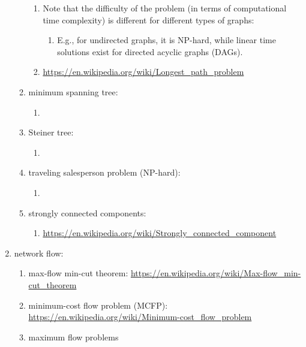 \begin{enumerate}
\begin{enumerate}
		\begin{enumerate} \itemsep -2pt
		\item Note that the difficulty of the problem (in terms of computational time complexity) is different for different types of graphs: \vspace{-0.1cm}
			\begin{enumerate} \itemsep -1pt
			\item E.g., for undirected graphs, it is NP-hard, while linear time solutions exist for directed acyclic graphs (DAGs).
			\end{enumerate}
		\item \url{https://en.wikipedia.org/wiki/Longest_path_problem}
		\end{enumerate}
	\item minimum spanning tree: \vspace{-0.2cm}
		\begin{enumerate} \itemsep -2pt
		\item 
		\end{enumerate}
	\item Steiner tree: \vspace{-0.2cm}
		\begin{enumerate} \itemsep -2pt
		\item 
		\end{enumerate}
	\item traveling salesperson problem (NP-hard): \vspace{-0.2cm}
		\begin{enumerate} \itemsep -2pt
		\item 
		\end{enumerate}
	\item strongly connected components: \vspace{-0.2cm}
		\begin{enumerate} \itemsep -2pt
		\item \url{https://en.wikipedia.org/wiki/Strongly_connected_component}
		\end{enumerate}
	\end{enumerate}
\item network flow: \vspace{-0.3cm}
	\begin{enumerate} \itemsep -2pt
	\item max-flow min-cut theorem: \url{https://en.wikipedia.org/wiki/Max-flow_min-cut_theorem}
	\item minimum-cost flow problem (MCFP): \url{https://en.wikipedia.org/wiki/Minimum-cost_flow_problem}
	\item maximum flow problems

\end{enumerate}
\end{enumerate}
